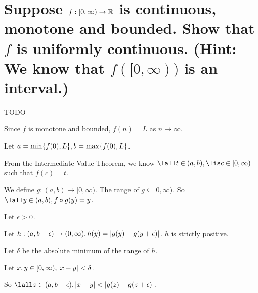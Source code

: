 \section{Suppose $f:[0,\infty) \to \mathbb{R}$ is continuous, monotone and bounded.
    Show that $f$ is uniformly continuous. (Hint: We know that $f([0,\infty))$ is an interval.)
}
    TODO


    Since $f$ is monotone and bounded, $f(n) = L$ as $n \to \infty$.

    Let $a = \min\{ f(0), L \}, b = \max\{ f(0), L \}$.

    From the Intermediate Value Theorem, 
    we know $\lall t \in (a,b), \lis c \in [0,\infty)$ 
    such that $f(c) = t$.

    We define $g: (a,b) \to [0,\infty)$.
    The range of $g \subseteq [0, \infty)$.
    So $\lall y \in (a,b), f \circ g (y) = y$.

    Let $\epsilon > 0$.

    Let $h: (a, b - \epsilon) \to (0, \infty), h(y) = \left|g(y) - g(y + \epsilon)\right|$.
    $h$ is strictly positive. %


    Let $\delta$ be the absolute minimum of the range of $h$.




    Let $x,y \in [0, \infty), \left|x - y\right| < \delta$.

    So $\lall z \in (a, b - \e),\abs{x-y} < \abs{g(z) - g(z + \e)}$.









